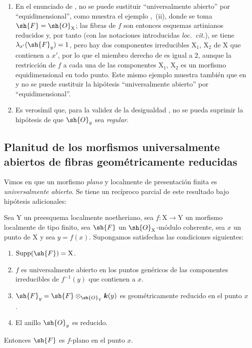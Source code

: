 \begin{remarks}[15.1.4]
\label{IV.15.1.4}
\begin{enumerate}[label=(\roman*)]
  \item En el enunciado de , no se puede sustituir ``universalmente abierto'' por ``equidimensional'', como muestra el ejemplo ,~(ii), donde se toma $\sh{F}=\sh{O}_\mathrm{X}$; las fibras de $f$ son entonces esquemas artinianos reducidos y, por tanto (con las notaciones introducidas \emph{loc.\ cit.}), se tiene $\lambda_{x'}(\sh{F}_y)=1$, pero hay dos componentes irreducibles $\mathrm{X}_1$, $\mathrm{X}_2$ de $\mathrm{X}$ que contienen a $x'$, por lo que el miembro derecho de  es igual a $2$, aunque la restricción de $f$ a cada una de las componentes $\mathrm{X}_1$, $\mathrm{X}_2$ es un morfismo equidimensional en todo punto.
Este mismo ejemplo muestra también que en  y  no se puede sustituir la hipótesis ``universalmente abierto'' por ``equidimensional''.
  \item Es verosímil que, para la validez de la desigualdad , no se pueda suprimir la hipótesis de que $\sh{O}_y$ sea \emph{regular}.
\end{enumerate}
\end{remarks}

\subsection{Planitud de los morfismos universalmente abiertos de fibras geométricamente reducidas}
\label{subsection:IV.15.2}

\begin{env}[15.2.1]
\label{IV.15.2.1}
Vimos en  que un morfismo \emph{plano} y localmente de presentación finita es \emph{universalmente abierto}.
Se tiene un recíproco parcial de este resultado bajo hipótesis adicionales:
\end{env}

\begin{theorem}[15.2.2]
\label{IV.15.2.2}
Sea $\mathrm{Y}$ un preesquema localmente noetheriano, sea $f:\mathrm{X}\to\mathrm{Y}$ un morfismo localmente de tipo finito, sea $\sh{F}$ un $\sh{O}_\mathrm{X}$-módulo coherente, sea $x$ un punto de $\mathrm{X}$ y sea $y=f(x)$.
Supongamos satisfechas las condiciones siguientes:
\begin{enumerate}[label=\textup{(\roman*)}]
  \item $\operatorname{Supp}(\sh{F})=\mathrm{X}$.
  \item $f$ es universalmente abierto en los puntos genéricos de las componentes irreducibles de $f^{-1}(y)$ que contienen a $x$.
  \item $\sh{F}_y=\sh{F}\otimes_{\sh{O}_\mathrm{Y}}\boldsymbol{k}(y)$ es geométricamente reducido en el punto $x$ .
  \item El anillo $\sh{O}_y$ es reducido.
\end{enumerate}
Entonces $\sh{F}$ es $f$-plano en el punto $x$.
\end{theorem}

